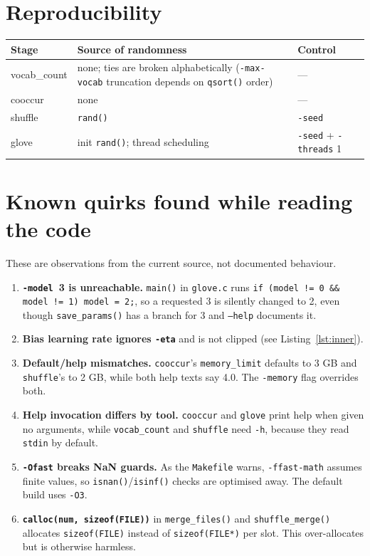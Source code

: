 \documentclass[11pt,a4paper]{article}
\newcommand{\file}[1]{\texttt{#1}}
\newcommand{\fn}[1]{\texttt{#1()}}
\newcommand{\opt}[1]{\texttt{-#1}}
\begin{document}
\section{Reproducibility}

\begin{center}
\begin{tabularx}{\linewidth}{lXl}
\toprule
Stage & Source of randomness & Control \\
\midrule
vocab\_count & none; ties are broken alphabetically (\opt{max-vocab} truncation depends on \fn{qsort} order) & --- \\
cooccur & none & --- \\
shuffle & \fn{rand} & \opt{seed} \\
glove & init \fn{rand}; thread scheduling & \opt{seed} + \opt{threads} 1 \\
\bottomrule
\end{tabularx}
\end{center}

\section{Known quirks found while reading the code}
\label{sec:quirks}

These are observations from the current source, not documented behaviour.

\begin{enumerate}
  \item \textbf{\opt{model}~3 is unreachable.} \fn{main} in \file{glove.c} runs
        \texttt{if (model != 0 \&\& model != 1) model = 2;}, so a requested 3 is silently
        changed to 2, even though \fn{save\_params} has a branch for 3 and \texttt{--help}
        documents it.
  \item \textbf{Bias learning rate ignores \opt{eta}} and is not clipped (see
        Listing~\ref{lst:inner}).
  \item \textbf{Default/help mismatches.} \texttt{cooccur}'s \texttt{memory\_limit}
        defaults to 3 GB and \texttt{shuffle}'s to 2 GB, while both help texts say 4.0.
        The \texttt{-memory} flag overrides both.
  \item \textbf{Help invocation differs by tool.} \texttt{cooccur} and \texttt{glove} print
        help when given no arguments, while \texttt{vocab\_count} and \texttt{shuffle}
        need \texttt{-h}, because they read \texttt{stdin} by default.
  \item \textbf{\texttt{-Ofast} breaks NaN guards.} As the \file{Makefile} warns,
        \texttt{-ffast-math} assumes finite values, so \fn{isnan}/\fn{isinf} checks are
        optimised away. The default build uses \texttt{-O3}.
  \item \textbf{\texttt{calloc(num, sizeof(FILE))}} in \fn{merge\_files} and
        \fn{shuffle\_merge} allocates \texttt{sizeof(FILE)} instead of
        \texttt{sizeof(FILE*)} per slot. This over-allocates but is otherwise harmless.
\end{enumerate}
\end{document}
